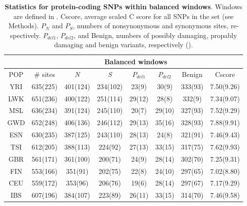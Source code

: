 \begin{refsection}
\begin{otherlanguage}{english}
\begin{table}[h]
\centering
\small
\begin{tabular}{@{}cccccccc@{}}
\toprule
 & \multicolumn{7}{c}{Balanced windows} \\ \midrule
\rowcolor[HTML]{9B9B9B} 
{\color[HTML]{000000} POP} & {\color[HTML]{000000} \# sites} & {\color[HTML]{000000} \emph{N}} & {\color[HTML]{000000} \emph{S}} & {\color[HTML]{000000} $P_{del1}$} & {\color[HTML]{000000} $P_{del2}$} & {\color[HTML]{000000} Benign} & {\color[HTML]{000000} Cscore} \\ \cmidrule(r){1-8}
YRI & 635(225) & 401(124) & 234(102) & 23(9) & 30(9) & 333(93) & 7.50(9.26) \\
LWK & 651(236) & 400(122) & 251(114) & 29(12) & 28(8) & 332(9) & 7.34(9.07) \\
MSL & 636(234) & 391(124) & 245(110) & 20(7) & 29(10) & 327(93) & 7.52(9.29) \\
GWD & 652(248) & 406(136) & 246(112) & 29(13) & 35(16) & 328(93) & 7.88(9.91) \\
ESN & 630(235) & 387(125) & 243(110) & 28(13) & 24(8) & 321(91) & 7.46(9.43) \\
TSI & 612(205) & 388(113) & 224(92) & 27(13) & 33(15) & 317(75) & 7.62(9.93) \\
GBR & 561(171) & 361(100) & 200(71) & 24(9) & 28(14) & 302(70) & 7.25(9.31) \\
FIN & 553(166) & 351(91) & 202(75) & 22(8) & 24(10) & 297(65) & 7.02(8.80) \\
CEU & 559(172) & 353(96) & 206(76) & 19(6) & 28(14) & 297(67) & 7.17(9.29) \\
IBS & 607(196) & 384(107) & 223(89) & 26(11) & 33(15) & 314(70) & 7.46(9.58) \\ \bottomrule
\end{tabular}
\caption{\textbf{Statistics for protein-coding SNPs within balanced windows}. Windows are defined in \textcite{Bitarello2016}. Cscore, average scaled C score for all SNPs in the set (see Methods). $P_{N}$ and $P_{S}$, numbers of nonsynonymous and synonymous sites, respectively. $P_{del1}$, $P_{del2}$, and Benign, numbers of possibly damaging, propably damaging and benign variants, respectively (\cite{Adzhubei2010}).
}
\label{tab:outlierSNPs}
\end{table}


\end{otherlanguage}
\end{refsection}
